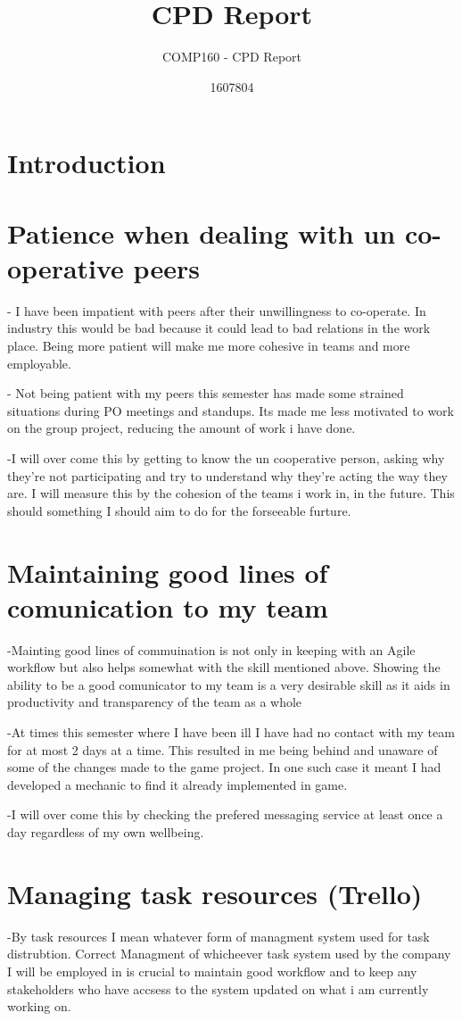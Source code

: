 \documentclass{scrartcl}
\title{CPD Report}
\subtitle{COMP160 - CPD Report}
\author{1607804}
\begin{document}
\maketitle

\section{Introduction}


\section{Patience when dealing with un co-operative peers}
- I have been impatient with peers after their unwillingness to co-operate. In industry this would be bad because it could lead to bad relations in the work place. Being more patient will make me more cohesive in teams and more employable.

- Not being patient with my peers this semester has made some strained situations during PO meetings and standups. Its made me less motivated to work on the group project, reducing the amount of work i have done.

-I will over come this by getting to know the un cooperative person, asking why they're not participating and try to understand why they're acting the way they are. I will measure this by the cohesion of the teams i work in, in the future. This should something I should aim to do for the forseeable furture. 

\section{Maintaining good lines of comunication to my team}
-Mainting good lines of commuination is not only in keeping with an Agile workflow but also helps somewhat with the skill mentioned above. Showing the ability to be a good comunicator to my team is a very desirable skill as it aids in productivity and transparency of the team as a whole

-At times this semester where I have been ill I have had no contact with my team for at most 2 days at a time. This resulted in me being behind and unaware of some of the changes made to the game project. In one such case it meant I had developed a mechanic to find it already implemented in game.

-I will over come this by checking the prefered messaging service at least once a day regardless of my own wellbeing. 


\section{Managing task resources (Trello)}
-By task resources I mean whatever form of managment system used for task distrubtion. Correct Managment of whicheever task system used by the company I will be employed in is crucial to maintain good workflow and to keep any stakeholders who have accsess to the system updated on what i am currently working on.
\end{document}
